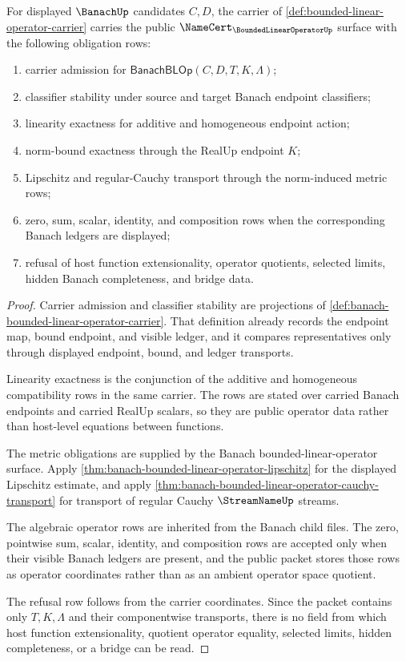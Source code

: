 \begin{theorem}
\label{thm:bounded-linear-operator-namecert-obligations}
For displayed $\BanachUp$ candidates $C,D$, the carrier of \autoref{def:bounded-linear-operator-carrier} carries the public $\NameCert_{\BoundedLinearOperatorUp}$ surface with the following obligation rows:
\begin{enumerate}
\item carrier admission for $\mathsf{BanachBLOp}(C,D,T,K,\Lambda)$;
\item classifier stability under source and target Banach endpoint classifiers;
\item linearity exactness for additive and homogeneous endpoint action;
\item norm-bound exactness through the RealUp endpoint $K$;
\item Lipschitz and regular-Cauchy transport through the norm-induced metric rows;
\item zero, sum, scalar, identity, and composition rows when the corresponding Banach ledgers are displayed;
\item refusal of host function extensionality, operator quotients, selected limits, hidden Banach completeness, and bridge data.
\end{enumerate}
\end{theorem}
\begin{proof}
Carrier admission and classifier stability are projections of \autoref{def:banach-bounded-linear-operator-carrier}. That definition already records the endpoint map, bound endpoint, and visible ledger, and it compares representatives only through displayed endpoint, bound, and ledger transports.

Linearity exactness is the conjunction of the additive and homogeneous compatibility rows in the same carrier. The rows are stated over carried Banach endpoints and carried RealUp scalars, so they are public operator data rather than host-level equations between functions.

The metric obligations are supplied by the Banach bounded-linear-operator surface. Apply \autoref{thm:banach-bounded-linear-operator-lipschitz} for the displayed Lipschitz estimate, and apply \autoref{thm:banach-bounded-linear-operator-cauchy-transport} for transport of regular Cauchy $\StreamNameUp$ streams.

The algebraic operator rows are inherited from the Banach child files. The zero, pointwise sum, scalar, identity, and composition rows are accepted only when their visible Banach ledgers are present, and the public packet stores those rows as operator coordinates rather than as an ambient operator space quotient.

The refusal row follows from the carrier coordinates. Since the packet contains only $T,K,\Lambda$ and their componentwise transports, there is no field from which host function extensionality, quotient operator equality, selected limits, hidden completeness, or a bridge can be read.
\end{proof}

